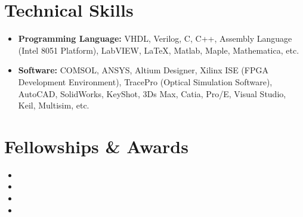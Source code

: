 \documentclass[11pt,a4paper,sans]{moderncv}         %
\begin{document}
    \section{Technical Skills}

    \vspace{3pt}

    \begin{itemize}

    \item \textbf{Programming Language:} VHDL, Verilog, C, C++, Assembly Language (Intel 8051 Platform), LabVIEW, \LaTeX, Matlab, Maple, Mathematica, etc.

    \vspace{2pt}

    \item \textbf{Software:} COMSOL, ANSYS, Altium Designer, Xilinx ISE (FPGA Development Environment), TracePro (Optical Simulation Software), AutoCAD, SolidWorks, KeyShot, 3Ds Max, Catia, Pro/E, Visual Studio, Keil, Multisim, etc.

\end{itemize}

\section{Fellowships \& Awards}

\vspace{3pt}

\begin{itemize}

    \item{}  

    \item{}  

    \item{}

    \item{}

\end{itemize}
\end{document}
